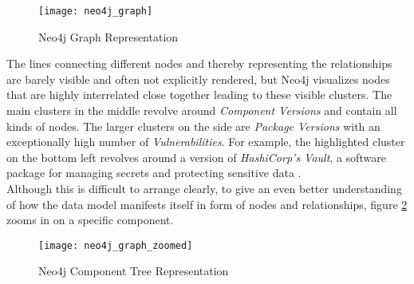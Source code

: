 \begin{figure}[H]
	\centering
	\texttt{[image: neo4j\_graph]}
	\caption[Neo4j Graph]{Neo4j Graph Representation }
	\label{fig:Neo4jGraph}
\end{figure}

The lines connecting different nodes and thereby representing the relationships are barely visible and often not explicitly rendered, but Neo4j visualizes nodes that are highly interrelated close together leading to these visible clusters. The main clusters in the middle revolve around \emph{Component Versions} and contain all kinds of nodes. The larger clusters on the side are \emph{Package Versions} with an exceptionally high number of \emph{Vulnerabilities}. For example, the highlighted cluster on the bottom left revolves around a version of \emph{HashiCorp's Vault}, a software package for managing secrets and protecting sensitive data \cite{vault}.\\

Although this is difficult to arrange clearly, to give an even better understanding of how the data model manifests itself in form of nodes and relationships, figure \ref{fig:Neo4jComponentTree} zooms in on a specific component.

\begin{figure}[H]
	\centering
	\texttt{[image: neo4j\_graph\_zoomed]}
	\caption[Neo4j Component Tree]{Neo4j Component Tree Representation }
	\label{fig:Neo4jComponentTree}
\end{figure}

